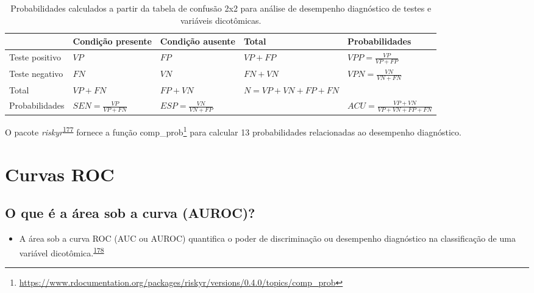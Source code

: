 \documentclass[
  a4paper,
]{book}
\providecommand{\tightlist}{%
  \setlength{\itemsep}{0pt}\setlength{\parskip}{0pt}}
\renewcommand{\href}[2]{#2\footnote{\url{#1}}}
\newenvironment{infobox}[1]
  {
  \begin{itemize}
  \renewcommand{\labelitemi}{
    \raisebox{-.7\height}[0pt][0pt]{
      {\setkeys{Gin}{width=3em,keepaspectratio}
        \texttt{[image: \#1]}}
    }
  }
  \setlength{\fboxsep}{1em}
  \begin{blackbox}
  \item
  }
  {
  \end{blackbox}
  \end{itemize}
  }
\begin{document}
\begin{table}

\caption{\label{tab:crosstable-prob}Probabilidades calculados a partir da tabela de confusão 2x2 para análise de desempenho diagnóstico de testes e variáveis dicotômicas.}
\centering
\begin{tabu} to 
\toprule
\textbf{ } & \textbf{Condição presente} & \textbf{Condição ausente} & \textbf{Total} & \textbf{Probabilidades}\\
\midrule
Teste positivo & $VP$ & $FP$ & $VP+FP$ & $VPP = \frac{VP}{VP+FP}$\\
Teste negativo & $FN$ & $VN$ & $FN+VN$ & $VPN = \frac{VN}{VN+FN}$\\
Total & $VP+FN$ & $FP+VN$ & $N=VP+VN+FP+FN$ & \\
Probabilidades & $SEN = \frac{VP}{VP+FN}$ & $ESP = \frac{VN}{VN+FP}$ &  & $ACU = \frac{VP+VN}{VP+VN+FP+FN}$\\
\bottomrule
\end{tabu}
\end{table}

\begin{infobox}{images/Rlogo}
O pacote \emph{riskyr}\textsuperscript{\protect\hyperlink{ref-riskyr}{177}} fornece a função \href{https://www.rdocumentation.org/packages/riskyr/versions/0.4.0/topics/comp_prob}{comp\_prob} para calcular 13 probabilidades relacionadas ao desempenho diagnóstico.

\end{infobox}

\hypertarget{curvas-roc}{%
\section{Curvas ROC}\label{curvas-roc}}

\hypertarget{o-que-uxe9-a-uxe1rea-sob-a-curva-auroc}{%
\subsection{O que é a área sob a curva (AUROC)?}\label{o-que-uxe9-a-uxe1rea-sob-a-curva-auroc}}

\begin{itemize}
\tightlist
\item
  A área sob a curva ROC (AUC ou AUROC) quantifica o poder de discriminação ou desempenho diagnóstico na classificação de uma variável dicotômica.\textsuperscript{\protect\hyperlink{ref-de2022}{178}}
\end{itemize}
\end{document}
